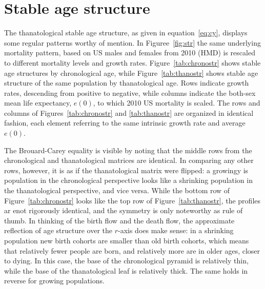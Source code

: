 \documentclass[12pt,oneside,a4paper,leqno]{article}
\begin{document}

\section*{Stable age structure}
The thanatological stable age structure, as given in equation~\eqref{eq:cy},
displays some regular patterns worthy of mention. In Figuree~\ref{fig:str} the
same underlying mortality pattern, based on US males and females from 2010 (HMD) is rescaled to different mortality levels and growth
rates. Figure~\ref{tab:chronostr} shows stable age structures by chronological
age, while Figure~\ref{tab:thanostr} shows stable age structure of the same
population by thanatological age. Rows indicate growth rates, descending from
positive to negative, while columns indicate the both-sex mean life expectancy,
$e(0)$, to which 2010 US mortality is scaled. The rows and columns of
Figures~\ref{tab:chronostr} and \ref{tab:thanostr} are organized in identical
fashion, each element referring to the same intrinsic growth rate and average
$e(0)$.

The Brouard-Carey equality is visible by noting that the middle rows from the
chronological and thanatological matrices are identical. In comparing any other
rows, however, it is as if the thanatological matrix were flipped: a growingy is population in the chronological perspective looks like a shrinking
population in the thanatological perspective, and vice versa. While the bottom row of
Figure~\ref{tab:chronostr} looks like the top row of Figure~\ref{tab:thanostr},
the profiles ar enot rigorously identical, and the symmetry is only noteworthy
as rule of thumb. In thinking of the birth flow and the death flow, the
approximate reflection of age structure over the $r$-axis does make sense: in a
shrinking population new birth cohorts are smaller than old birth cohorts, which
means that relatively fewer people are born, and relatively more are in older
ages, closer to dying. In this case, the base of the chronological pyramid is
relatively thin, while the base of the thanatological leaf is relatively thick.
The same holds in reverse for growing populations. 
\end{document}
